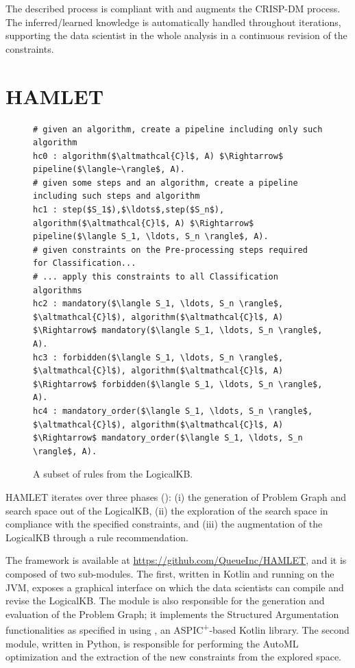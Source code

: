 The described process is compliant with and augments the CRISP-DM process.
The inferred/learned knowledge is automatically handled throughout iterations, supporting the data scientist in the whole analysis in a continuous revision of the constraints.
\vspace{2cm}

\section{HAMLET}\label{hamlet-sec:implementation}

\begin{figure}[t]
\begin{lstlisting}[mathescape=true]
# given an algorithm, create a pipeline including only such algorithm
hc0 : algorithm($\altmathcal{C}l$, A) $\Rightarrow$ pipeline($\langle~\rangle$, A).
# given some steps and an algorithm, create a pipeline including such steps and algorithm
hc1 : step($S_1$),$\ldots$,step($S_n$), algorithm($\altmathcal{C}l$, A) $\Rightarrow$ pipeline($\langle S_1, \ldots, S_n \rangle$, A).
# given constraints on the Pre-processing steps required for Classification...
# ... apply this constraints to all Classification algorithms
hc2 : mandatory($\langle S_1, \ldots, S_n \rangle$, $\altmathcal{C}l$), algorithm($\altmathcal{C}l$, A) $\Rightarrow$ mandatory($\langle S_1, \ldots, S_n \rangle$, A).
hc3 : forbidden($\langle S_1, \ldots, S_n \rangle$, $\altmathcal{C}l$), algorithm($\altmathcal{C}l$, A) $\Rightarrow$ forbidden($\langle S_1, \ldots, S_n \rangle$, A).
hc4 : mandatory_order($\langle S_1, \ldots, S_n \rangle$, $\altmathcal{C}l$), algorithm($\altmathcal{C}l$, A) $\Rightarrow$ mandatory_order($\langle S_1, \ldots, S_n \rangle$, A).
\end{lstlisting}
\caption{A subset of rules from the LogicalKB.}
\label{rules-arg2p}
\end{figure}

HAMLET iterates over three phases (): (i) the generation of Problem Graph and search space out of the LogicalKB, (ii) the exploration of the search space in compliance with the specified constraints, and (iii) the augmentation of the LogicalKB through a rule recommendation.

The framework is available at \url{https://github.com/QueueInc/HAMLET}, and it is composed of two sub-modules. 
The first, written in Kotlin and running on the JVM, exposes a graphical interface on which the data scientists can compile and revise the LogicalKB. 
The module is also responsible for the generation and evaluation of the Problem Graph; it implements the Structured Argumentation functionalities as specified in  using \argtup{} \cite{arg2p-jlc}, an ASPIC\textsuperscript{+}-based Kotlin library.
The second module, written in Python, is responsible for performing the AutoML optimization and the extraction of the new constraints from the explored space.

